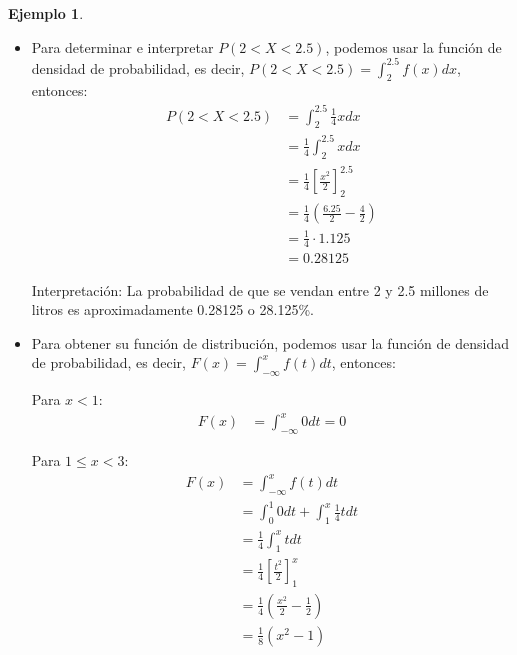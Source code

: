 \documentclass{article}
\theoremstyle{definition}
\newtheorem{example}[definition]{Ejemplo}
\theoremstyle{plain}
\theoremstyle{remark}
\begin{document}
\begin{example}
\begin{itemize}
\begin{align*}
P(1.5 < X < 2.5) &= \int_{1.5}^{2.5} \frac{1}{4} x dx \\
&= \frac{1}{4} \int_{1.5}^{2.5} x dx \\
&= \frac{1}{4} \left[ \frac{x^2}{2} \right]_{1.5}^{2.5} \\
&= \frac{1}{4} \left( \frac{6.25}{2} - \frac{2.25}{2} \right) \\
&= \frac{1}{4} \cdot 2 \\
&= \frac{1}{2}
\end{align*}

Por lo tanto, la probabilidad de que se vendan entre 1.5 y 2.5 millones de litros es $\frac{1}{2}$ o 50\%.

\item Para determinar e interpretar $P(2 < X < 2.5)$, podemos usar la función de densidad de probabilidad, es decir, $P(2 < X < 2.5) = \int_{2}^{2.5} f(x) dx$, entonces:
\begin{align*}
P(2 < X < 2.5) &= \int_{2}^{2.5} \frac{1}{4} x dx \\
&= \frac{1}{4} \int_{2}^{2.5} x dx \\
&= \frac{1}{4} \left[ \frac{x^2}{2} \right]_{2}^{2.5} \\
&= \frac{1}{4} \left( \frac{6.25}{2} - \frac{4}{2} \right) \\
&= \frac{1}{4} \cdot 1.125 \\
&= 0.28125
\end{align*}

Interpretación: La probabilidad de que se vendan entre 2 y 2.5 millones de litros es aproximadamente 0.28125 o 28.125\%.

\item Para obtener su función de distribución, podemos usar la función de densidad de probabilidad, es decir, $F(x) = \int_{-\infty}^{x} f(t) dt$, entonces:

Para $x < 1$:
\begin{align*}
F(x) &= \int_{-\infty}^{x} 0 dt = 0
\end{align*}

Para $1 \leq x < 3$:
\begin{align*}
F(x) &= \int_{-\infty}^{x} f(t) dt \\
&= \int_{0}^{1} 0 dt + \int_{1}^{x} \frac{1}{4} t dt \\
&= \frac{1}{4} \int_{1}^{x} t dt \\
&= \frac{1}{4} \left[ \frac{t^2}{2} \right]_{1}^{x} \\
&= \frac{1}{4} \left( \frac{x^2}{2} - \frac{1}{2} \right) \\
&= \frac{1}{8} (x^2 - 1)
\end{align*}


\end{itemize}
\end{example}
\end{document}
